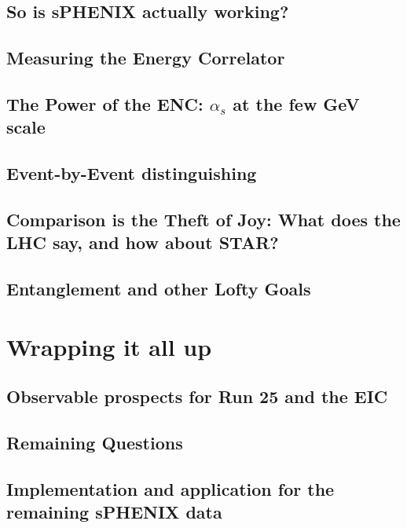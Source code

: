 \documentclass[letterpaper, 12pt, oneside]{book}
\theoremstyle{definition}
\begin{document}
\chapter{So is sPHENIX actually working?}
\chapter{Measuring the Energy Correlator}
\chapter{The Power of the ENC: $\alpha_s$ at the few GeV scale}
\chapter{Event-by-Event distinguishing}
\chapter{Comparison is the Theft of Joy: What does the LHC say, and how about STAR?}
\chapter{Entanglement and other Lofty Goals}
\part{Wrapping it all up}
\chapter{Observable prospects for Run 25 and the EIC}
\chapter{Remaining Questions}
\chapter{Implementation and application for the remaining sPHENIX data}
\singlespacing
\printbibliography
%
%
\end{document}
